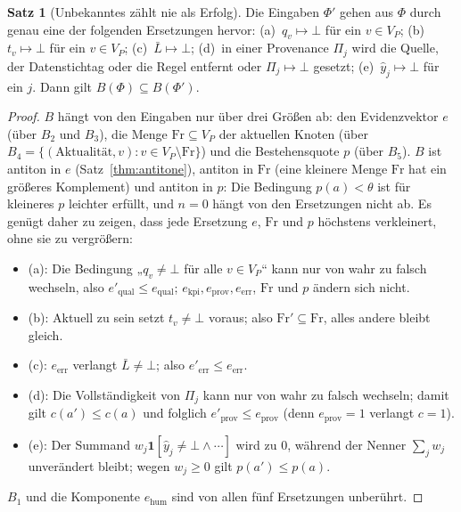 \documentclass[a4paper,12pt]{article}
\theoremstyle{definition}
\newtheorem{satz}[definition]{Satz}
\begin{document}
\begin{satz}[Unbekanntes zählt nie als Erfolg]\label{thm:conservative}
Die Eingaben $\Phi'$ gehen aus $\Phi$ durch genau eine der folgenden Ersetzungen hervor:
(a)~$q_v\mapsto\bot$ für ein $v\in V_P$; (b)~$t_v\mapsto\bot$ für ein $v\in V_P$; (c)~$\bar L\mapsto\bot$; (d)~in einer Provenance $\Pi_j$ wird die Quelle, der Datenstichtag oder die Regel entfernt oder $\Pi_j\mapsto\bot$ gesetzt; (e)~$\hat y_j\mapsto\bot$ für ein $j$. Dann gilt $B(\Phi)\subseteq B(\Phi')$.
\end{satz}
\begin{proof}
$B$ hängt von den Eingaben nur über drei Größen ab: den Evidenzvektor $e$ (über $B_2$ und $B_3$), die Menge $\mathrm{Fr}\subseteq V_P$ der aktuellen Knoten (über $B_4=\{(\mathrm{Aktualität},v):v\in V_P\setminus\mathrm{Fr}\}$) und die Bestehensquote $p$ (über $B_5$). $B$ ist antiton in $e$ (Satz~\ref{thm:antitone}), antiton in $\mathrm{Fr}$ (eine kleinere Menge $\mathrm{Fr}$ hat ein größeres Komplement) und antiton in $p$: Die Bedingung $p(a)<\theta$ ist für kleineres $p$ leichter erfüllt, und $n=0$ hängt von den Ersetzungen nicht ab. Es genügt daher zu zeigen, dass jede Ersetzung $e$, $\mathrm{Fr}$ und $p$ höchstens verkleinert, ohne sie zu vergrößern:
\begin{itemize}
\item (a): Die Bedingung „$q_v\neq\bot$ für alle $v\in V_P$“ kann nur von wahr zu falsch wechseln, also $e'_{\mathrm{qual}}\le e_{\mathrm{qual}}$; $e_{\mathrm{kpi}},e_{\mathrm{prov}},e_{\mathrm{err}}$, $\mathrm{Fr}$ und $p$ ändern sich nicht.
\item (b): Aktuell zu sein setzt $t_v\neq\bot$ voraus; also $\mathrm{Fr}'\subseteq\mathrm{Fr}$, alles andere bleibt gleich.
\item (c): $e_{\mathrm{err}}$ verlangt $\bar L\neq\bot$; also $e'_{\mathrm{err}}\le e_{\mathrm{err}}$.
\item (d): Die Vollständigkeit von $\Pi_j$ kann nur von wahr zu falsch wechseln; damit gilt $c(a')\le c(a)$ und folglich $e'_{\mathrm{prov}}\le e_{\mathrm{prov}}$ (denn $e_{\mathrm{prov}}=1$ verlangt $c=1$).
\item (e): Der Summand $w_j\mathbf 1[\hat y_j\neq\bot\wedge\cdots]$ wird zu $0$, während der Nenner $\sum_j w_j$ unverändert bleibt; wegen $w_j\ge 0$ gilt $p(a')\le p(a)$.
\end{itemize}
$B_1$ und die Komponente $e_{\mathrm{hum}}$ sind von allen fünf Ersetzungen unberührt.
\end{proof}
\end{document}

